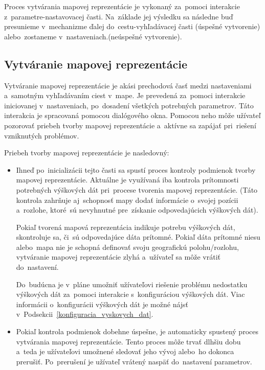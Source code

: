 Proces vytvárania mapovej reprezentácie je vykonaný za~pomoci interakcie z~parametre-nastavovacej časti. Na~základe jej výsledku sa následne buď presunieme v~mechanizme ďalej do~cestu-vyhľadávacej časti (úspešné vytvorenie) alebo~zostaneme v~nastaveniach.(neúspešné vytvorenie).  

\subsection{Vytváranie mapovej reprezentácie}

Vytváranie mapovej reprezentácie je akási prechodová časť medzi nastaveniami a~samotným vyhľadávaním ciest v~mape. Je prevedená za~pomoci interakcie iniciovanej v~nastaveniach, po~dosadení všetkých potrebných parametrov. Táto interakcia je spracovaná pomocou dialógového okna. Pomocou neho môže užívateľ pozorovať priebeh tvorby mapovej reprezentácie a~aktívne sa zapájať pri~riešení vzniknutých problémov.  

Priebeh tvorby mapovej reprezentácie je nasledovný:
\begin{itemize}
    \item Ihneď po~inicializácii tejto časti sa spustí proces kontroly podmienok tvorby mapovej reprezentácie. Aktuálne je využívaná iba kontrola prítomnosti potrebných výškových dát pri~procese tvorenia mapovej reprezentácie. (Táto kontrola zahrňuje aj~schopnosť mapy dodať informácie o~svojej pozícii a~rozlohe, ktoré~sú nevyhnutné pre~získanie odpovedajúcich výškových dát).
    
    Pokiaľ tvorená mapová reprezentácia indikuje potrebu výškových dát, skontroluje sa, či~sú odpovedajúce dáta prítomné. Pokiaľ dáta prítomné niesu alebo~mapa nie je schopná definovať svoju geografickú polohu/rozlohu, vytváranie mapovej reprezentácie zlyhá a~užívateľ sa môže vrátiť do~nastavení. 
    
    Do~budúcna je v~pláne umožniť užívateľovi riešenie problému nedostatku výškových dát za~pomoci interakcie s~konfiguráciou výškových dát. Viac informácii o~konfigurácii výškových dát je možné nájsť v~Podsekcii~\ref{konfiguracia_vyskovych_dat}.
    \item Pokiaľ kontrola podmienok dobehne úspešne, je automaticky spustený proces vytvárania mapovej reprezentácie. Tento proces môže trvať dlhšiu dobu a~teda je užívateľovi umožnené sledovať jeho vývoj alebo~ho dokonca prerušiť. Po~prerušení je užívateľ vrátený naspäť do~nastavení parametrov.
\end{itemize}

